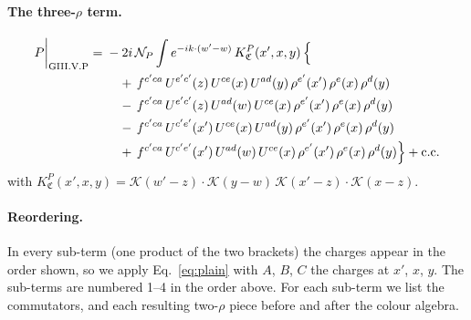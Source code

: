 \documentclass[10pt]{article}
\numberwithin{equation}{section}
\newcommand{\KK}{\mathcal K}
\newcommand{\NP}{\mathcal N_{P}}
\begin{document}
\paragraph{The three-$\rho$ term.}
\begin{align}
P\bigg|_{\rm GIII.V.P}={}&-2i\,\NP\int e^{-ik\cdot(w'-w)}\,K^{P}_{\mathfrak C}(x',x,y)\,\Big\{\notag\\
&\quad +\,f^{c'ca}\,U^{e'c'}(z)\,U^{ce}(x)\,U^{ad}(y)\,\rho^{e'}(x')\,\rho^{e}(x)\,\rho^{d}(y)\notag\\
&\quad -\,f^{c'ca}\,U^{e'c'}(z)\,U^{ad}(w)\,U^{ce}(x)\,\rho^{e'}(x')\,\rho^{e}(x)\,\rho^{d}(y)\notag\\
&\quad -\,f^{c'ca}\,U^{c'e'}(x')\,U^{ce}(x)\,U^{ad}(y)\,\rho^{e'}(x')\,\rho^{e}(x)\,\rho^{d}(y)\notag\\
&\quad +\,f^{c'ca}\,U^{c'e'}(x')\,U^{ad}(w)\,U^{ce}(x)\,\rho^{e'}(x')\,\rho^{e}(x)\,\rho^{d}(y)\Big\}+{\rm c.c.}\label{eq:in-GIII.V.P}
\end{align}
with $K^{P}_{\mathfrak C}(x',x,y)=\KK(w'-z)\cdot\KK(y-w)\,\KK(x'-z)\cdot\KK(x-z)$.
\paragraph{Reordering.} In every sub-term (one product of the two brackets) the charges appear in the order shown, so we apply Eq.~\eqref{eq:plain} with $A$, $B$, $C$ the charges at $x'$, $x$, $y$. The sub-terms are numbered 1--4 in the order above. For each sub-term we list the commutators, and each resulting two-$\rho$ piece before and after the colour algebra.
\end{document}
